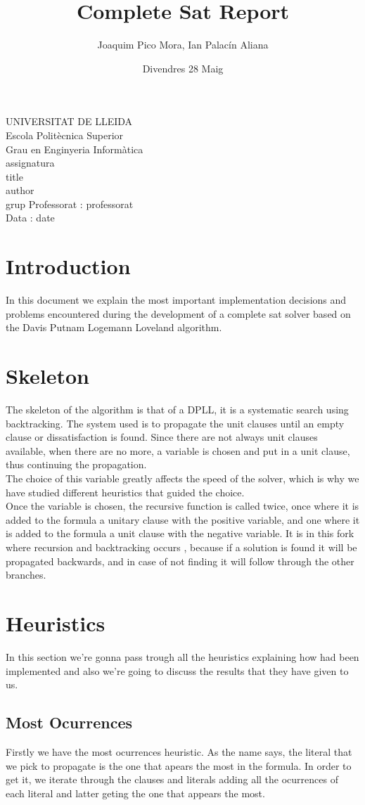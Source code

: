 \documentclass{article}
\title{Complete Sat Report}
\author{Joaquim Pico Mora, Ian Palacín Aliana}
\date{Divendres 28 Maig}
\renewcommand{\maketitle}{ %
	\begin{titlepage}
		\raggedright{UNIVERSITAT DE LLEIDA \\
			Escola Politècnica Superior \\
			Grau en Enginyeria Informàtica\\
			\1assignatura\\}
		\vspace{5cm}
		\centering\huge{\5title \\}
		\vspace{3cm}
		\large{\6author} \\
		\normalsize{\3grup}
		\vfill
		Professorat : \4professorat \\
		Data : \7date
\end{titlepage}}
\begin{document}
	\maketitle
	\thispagestyle{empty}


\section{Introduction}
In this document we explain the most important implementation decisions and problems
encountered during the development of a complete sat solver based on the Davis Putnam
Logemann Loveland algorithm.
%
\section{Skeleton}

The skeleton of the algorithm is that of a DPLL, it is a systematic search using backtracking.
The system used is to propagate the unit clauses until an empty clause  or
dissatisfaction is found. Since there are not always unit clauses available, when
there are no more, a variable is chosen and put in a unit clause, thus continuing the
propagation. \\

The choice of this variable greatly affects the speed of the solver, which is why we have studied
different heuristics that guided the choice. \\

Once the variable is chosen, the recursive function is called twice, once where it is added
to the formula a unitary clause with the positive variable, and one where it is added to the formula
a unit clause with the negative variable. It is in this fork where recursion and backtracking occurs
, because if a solution is found it will be propagated backwards, and in case of
not finding it will follow through the other branches.

%
\section{Heuristics}
In this section we're gonna pass trough all the heuristics explaining how had been implemented and also we're going to discuss the results that they have given to us. 
\subsection{Most Ocurrences}
Firstly we have the most ocurrences heuristic. As the name says, the literal that we pick to propagate is the one that apears the most in the formula. In order to get it, we iterate through the clauses and literals adding all the ocurrences of each literal and latter geting the one that appears the most.
\end{document}
